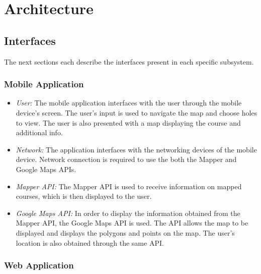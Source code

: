 \documentclass{article}
\begin{document}
    \newpage


    \section{Architecture}

    \subsection{Interfaces}

    The next sections each describe the interfaces present in each specific
    subsystem.

    \subsubsection{Mobile Application}

    \begin{itemize}
        \item \textit{User:} The mobile application interfaces with the user
            through the mobile device's screen. The user's input is used to
            navigate the map and choose holes to view. The user is also
            presented with a map displaying the course and additional info.
        \item \textit{Network:} The application interfaces with the networking
            devices of the mobile device. Network connection is required to use
            the both the Mapper and Google Maps APIs.
        \item \textit{Mapper API:} The Mapper API is used to receive
            information on mapped courses, which is then displayed to the user.
        \item \textit{Google Maps API:} In order to display the information
            obtained from the Mapper API, the Google Maps API is used. The API
            allows the map to be displayed and displays the polygons and points
            on the map. The user's location is also obtained through the same
            API.
    \end{itemize}

    \subsubsection{Web Application}
\end{document}
